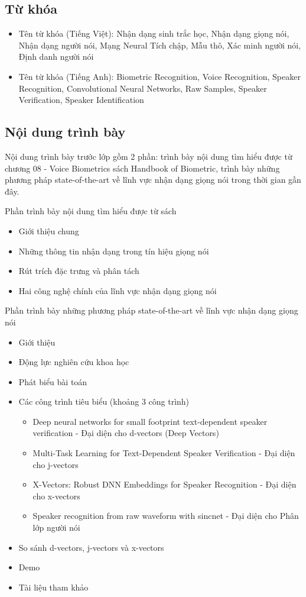 \documentclass{article}
\begin{document}
	\subsection{Từ khóa}
	\begin{itemize}
		\item Tên từ khóa (Tiếng Việt): Nhận dạng sinh trắc học, Nhận dạng giọng nói, Nhận dạng người nói, Mạng Neural Tích chập, Mẫu thô, Xác minh người nói, Định danh người nói
		\item 	Tên từ khóa (Tiếng Anh): Biometric Recognition, Voice Recognition, Speaker Recognition, Convolutional Neural Networks, Raw Samples, Speaker Verification, Speaker Identification
	\end{itemize}
	
	\subsection{Nội dung trình bày}
	\qquad Nội dung trình bày trước lớp gồm 2 phần: trình bày nội dung tìm hiểu được từ chương 08 - Voice Biometrics sách Handbook of Biometric, trình bày những phương pháp state-of-the-art về lĩnh vực nhận dạng giọng nói trong thời gian gần đây.
	
	Phần trình bày nội dung tìm hiểu được từ sách
	\begin{itemize}
		\item Giới thiệu chung
		\item Những thông tin nhận dạng trong tín hiệu giọng nói
		\item Rút trích đặc trưng và phân tách
		\item Hai công nghệ chính của lĩnh vực nhận dạng giọng nói
	\end{itemize}
	Phần trình bày những phương pháp state-of-the-art về lĩnh vực nhận dạng giọng nói
	\begin{itemize}
		\item Giới thiệu
		\item Động lực nghiên cứu khoa học
		\item Phát biểu bài toán
		\item Các công trình tiêu biểu (khoảng 3 công trình)
		\begin{itemize}
			\item Deep neural networks for small footprint text-dependent speaker verification - Đại diện cho d-vectors (Deep Vectors)
			\item Multi-Task Learning for Text-Dependent Speaker Verification - Đại diện cho j-vectors
			\item X-Vectors: Robust DNN Embeddings for Speaker Recognition - Đại diện cho x-vectors
			\item Speaker recognition from raw waveform with sincnet - Đại diện cho Phân lớp người nói
		\end{itemize}
		\item So sánh d-vectors, j-vectors và x-vectors
		\item Demo
		\item Tài liệu tham khảo
	\end{itemize}
\end{document}
